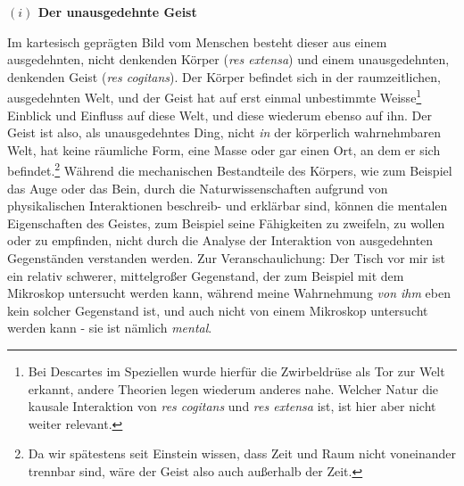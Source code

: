 \documentclass[a4paper, 12pt]{article}
\begin{document}
\begin{onehalfspace}

\vspace{5mm}
\noindent\textbf{$(i)$ Der unausgedehnte Geist}



\noindent Im kartesisch geprägten Bild vom Menschen besteht dieser aus einem ausgedehnten, nicht denkenden Körper (\emph{res extensa}) und einem unausgedehnten, denkenden Geist (\emph{res cogitans}). Der Körper befindet sich in der raumzeitlichen, ausgedehnten Welt, und der Geist hat auf erst einmal unbestimmte Weisse\footnote{Bei Descartes im Speziellen wurde hierfür die Zwirbeldrüse als Tor zur Welt erkannt, andere Theorien legen wiederum anderes nahe. Welcher Natur die kausale Interaktion von \emph{res cogitans} und \emph{res extensa} ist, ist hier aber nicht weiter relevant.} Einblick und Einfluss auf diese Welt, und diese wiederum ebenso auf ihn. Der Geist ist also, als unausgedehntes Ding, nicht \emph{in} der körperlich wahrnehmbaren Welt, hat keine räumliche Form, eine Masse oder gar einen Ort, an dem er sich befindet.\footnote{Da wir spätestens seit Einstein wissen, dass Zeit und Raum nicht voneinander trennbar sind, wäre der Geist also auch außerhalb der Zeit.} Während die mechanischen Bestandteile des Körpers, wie zum Beispiel das Auge oder das Bein, durch die Naturwissenschaften aufgrund von physikalischen Interaktionen beschreib- und erklärbar sind, können die mentalen Eigenschaften des Geistes, zum Beispiel seine Fähigkeiten zu zweifeln, zu wollen oder zu empfinden, nicht durch die Analyse der Interaktion von ausgedehnten Gegenständen verstanden werden. Zur Veranschaulichung: Der Tisch vor mir ist ein relativ schwerer, mittelgroßer Gegenstand, der zum Beispiel mit dem Mikroskop untersucht werden kann, während meine Wahrnehmung \emph{von ihm} eben kein solcher Gegenstand ist, und auch nicht von einem Mikroskop untersucht werden kann - sie ist nämlich \emph{mental}. 


\end{onehalfspace}
\end{document}
